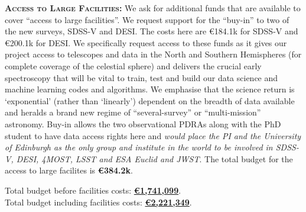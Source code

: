 \smallskip
\smallskip
\noindent
\textbf{\textsc{Access to Large Facilities:}}
We ask for additional funds that are available to cover ``access to large facilities''. 
We request support for the ``buy-in'' to two of the new surveys,
SDSS-V and DESI. The costs here are \euro184.1k for
SDSS-V and \euro200.1k for DESI.  
We specifically request access to these
funds as it gives our project access to telescopes and data in the
North and Southern Hemispheres (for complete coverage of the celestial
sphere) and delivers the crucial early spectroscopy that will be vital
to train, test and build our data science and machine learning codes
and algorithms.  We emphasise that the science return is `exponential'
(rather than `linearly') dependent on the breadth of data available
and heralds a brand new regime of ``several-survey'' or
``multi-mission'' astronomy. 
Buy-in allows the two observational PDRAs along with the PhD student 
to have data access rights here and 
 {\it would place the
PI and the University of Edinburgh as the only group and institute
in the world to be involved in SDSS-V, DESI, 4MOST, LSST and ESA {\it
Euclid} and JWST}.
The total budget for the access to large facilites is {\bf \euro384.2k}.

\smallskip
\smallskip
\noindent
Total budget before facilities costs: \textbf{\underline{\euro 1,741,099}}. \\
Total budget including facilities costs: \textbf{\underline{\euro 2,221,349}}.\\

